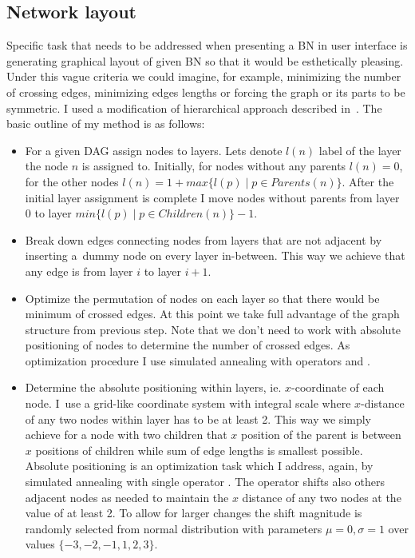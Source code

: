 \documentclass[english,cover]{fitthesis} %
\begin{document}
\subsection{Network layout}
Specific task that needs to be addressed when presenting a BN in user interface is generating graphical layout of given BN so that it would be esthetically pleasing. Under this vague criteria we could imagine, for example, minimizing the number of crossing edges, minimizing edges lengths or forcing the graph or its parts to be symmetric. I used a modification of hierarchical approach described in~\cite[p.~22]{graph_drawing}. The basic outline of my method is as follows:
\begin{itemize}
	\item For a given DAG assign nodes to layers. Lets denote $l(n)$ label of the layer the node $n$ is assigned to. Initially, for nodes without any parents $l(n)=0$, for the other nodes $l(n) = 1 + max \lbrace l(p) \mid p \in Parents(n)\rbrace$. After the initial layer assignment is complete I move nodes without parents from layer 0 to layer $min \lbrace l(p) \mid p \in Children(n)\rbrace - 1$.
	\item Break down edges connecting nodes from layers that are not adjacent by inserting a~dummy node on every layer in-between. This way we achieve that any edge is from layer $i$ to layer $i+1$.
	\item Optimize the permutation of nodes on each layer so that there would be minimum of crossed edges. At this point we take full advantage of the graph structure from previous step. Note that we don't need to work with absolute positioning of nodes to determine the number of crossed edges. As optimization procedure I use simulated annealing with operators  and .
    \item Determine the absolute positioning within layers, ie. $x$-coordinate of each node. I~use a grid-like coordinate system with integral scale where $x$-distance of any two nodes within layer has to be at least 2. This way we simply achieve for a node with two children that $x$ position of the parent is between $x$ positions of children while sum of edge lengths is smallest possible. Absolute positioning is an optimization task which I address, again, by simulated annealing with single operator . The operator shifts also others adjacent nodes as needed to maintain the $x$ distance of any two nodes at the value of at least 2. To allow for larger changes the shift magnitude is randomly selected from normal distribution with parameters $\mu=0, \sigma = 1$ over values $\lbrace -3, -2, -1, 1, 2, 3\rbrace$.
\end{itemize}
\end{document}
